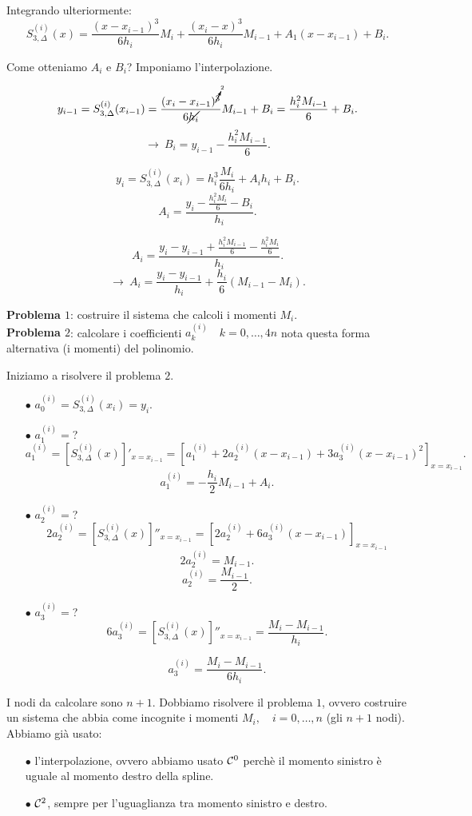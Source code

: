 Integrando ulteriormente:
\[
S_{3,\Delta}^{(i)}(x) = \frac{(x-x_{i-1})^3}{6h_i}M_i 
+ \frac{(x_i-x)^3}{6h_i}M_{i-1} + A_1(x-x_{i-1}) + B_i.
\]

Come otteniamo $A_i$ e $B_i$? Imponiamo l'interpolazione.

\[
y_{i-1} = S_{3,\Delta}^{(i)}(x_{i-1}) = 
\frac{(x_i-x_{i-1})^{\cancelto{2}{3}}}{6\cancel{h_i}}M_{i-1} + B_i
= \frac{h_i^2 M_{i-1}}{6}+ B_i.
\]
\[ \longrightarrow \
B_i = y_{i-1} - \frac{h_i^2 M_{i-1}}{6}.
\]

\[
y_{i} = S_{3,\Delta}^{(i)}(x_{i}) = h_i^3
\frac{M_i}{6h_i} + A_ih_i+ B_i.
\]
\[
A_i = \frac{y_{i} -\frac{h_i^2M_i}{6}-B_i}{h_i}.
\]

\[
A_i = \frac{y_{i} -y_{i-1} + \frac{h_i^2 M_{i-1}}{6}-\frac{h_i^2M_i}{6}}{h_i}.
\]
\[\longrightarrow \
A_i = \frac{y_{i} -y_{i-1}}{h_i} + \frac{h_i}{6}\left(M_{i-1}-M_i
\right).
\]

\textbf{Problema $1$}: costruire il sistema che calcoli i momenti $M_i$.\\

\textbf{Problema $2$}: calcolare i coefficienti $a_{k}^{(i)}\quad k = 0,\ldots,
 4n$ nota questa forma alternativa (i momenti) del polinomio.

Iniziamo a risolvere il problema $2$.
\begin{itemize}
\item[$\bullet$]$a_0^{(i)} = S_{3,\Delta}^{(i)}(x_{i}) = y_{i}.$
\item[$\bullet$]$a_1^{(i)} = $?
\[a_1^{(i)} =
\left[S_{3,\Delta}^{(i)}(x) \right]'_{x = x_{i-1}} 
= \left[a_1^{(i)} + 2a_2^{(i)}(x-x_{i-1}) 
+ 3a_3^{(i)}(x-x_{i-1})^2\right]_{x = x_{i-1}}.
\]
\[a_1^{(i)} =
-\frac{h_i}{2}M_{i-1} + A_i.
\]
\item[$\bullet$]$a_2^{(i)} = $?
\[2a_2^{(i)} =
\left[S_{3,\Delta}^{(i)}(x) \right]''_{x = x_{i-1}} 
= \left[ 2a_2^{(i)} + 6 a_3^{(i)}(x-x_{i-1})\right]_{x = x_{i-1}}
\]
\[2a_2^{(i)} = M_{i-1}.
\]
\[a_2^{(i)} = \frac{M_{i-1}}{2}.\]
\item[$\bullet$]$a_3^{(i)} = $?
\[
6a_3^{(i)} =
\left[S_{3,\Delta}^{(i)}(x) \right]''_{x = x_{i-1}} = \frac{M_i - M_{i-1}}{h_i}.
\]

\[
a_3^{(i)} = \frac{M_i - M_{i-1}}{6h_i}.
\]
\end{itemize}

I nodi da calcolare sono $n+1$. Dobbiamo risolvere il problema $1$, ovvero
costruire un sistema che abbia come incognite i momenti $M_i, \quad i =0,
\ldots, n$ (gli $n+1$ nodi). Abbiamo già usato:
\begin{itemize}
\item[$\bullet$] l'interpolazione, ovvero abbiamo usato $\mathcal{C}^0$ perchè
il momento sinistro è uguale al momento destro della spline.
\item[$\bullet$]$\mathcal{C}^2$, sempre per l'uguaglianza tra momento sinistro e 
destro.  
\end{itemize}

